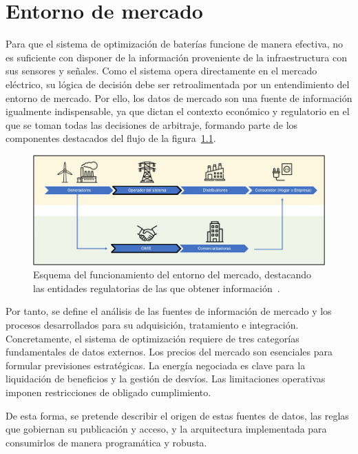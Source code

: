 
\cleardoublepage%

\chapter{Entorno de mercado}%
\label{makereference4}

Para que el sistema de optimización de baterías funcione de manera efectiva, no es suficiente con disponer de la información proveniente de la infraestructura con sus sensores y señales. Como el sistema opera directamente en el mercado eléctrico, su lógica de decisión debe ser retroalimentada por un entendimiento del entorno de mercado. Por ello, los datos de mercado son una fuente de información igualmente indispensable, ya que dictan el contexto económico y regulatorio en el que se toman todas las decisiones de arbitraje, formando parte de los componentes destacados del flujo de la figura~\ref{fig:esquema-mercado}.

\begin{figure}
  \centering
  \includegraphics[width=0.75\linewidth]{figures/esquema-mercado.jpg}
  \caption[Esquema del funcionamiento del mercado.]{Esquema del funcionamiento del entorno del mercado, destacando las entidades regulatorias de las que obtener información~\cite{villagrasa2023como}.}%
  \label{fig:esquema-mercado}
\end{figure}

Por tanto, se define el análisis de las fuentes de información de mercado y los procesos desarrollados para su adquisición, tratamiento e integración. Concretamente, el sistema de optimización requiere de tres categorías fundamentales de datos externos. Los precios del mercado son esenciales para formular previsiones estratégicas. La energía negociada es clave para la liquidación de beneficios y la gestión de desvíos. Las limitaciones operativas imponen restricciones de obligado cumplimiento.

De esta forma, se pretende describir el origen de estas fuentes de datos, las reglas que gobiernan su publicación y acceso, y la arquitectura implementada para consumirlos de manera programática y robusta.


